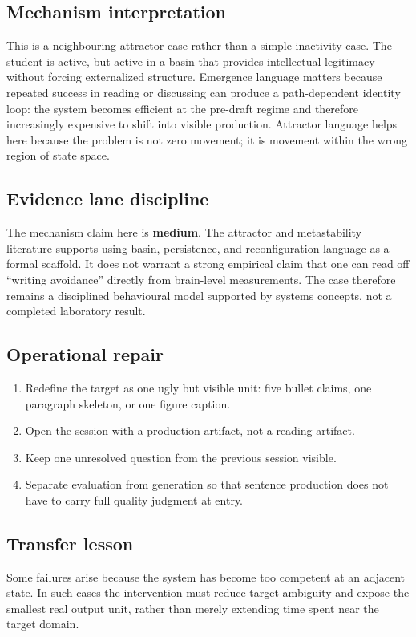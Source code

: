 \subsection*{Mechanism interpretation}
This is a neighbouring-attractor case rather than a simple inactivity case.
The student is active, but active in a basin that provides intellectual
legitimacy without forcing externalized structure. Emergence language matters
because repeated success in reading or discussing can produce a path-dependent
identity loop: the system becomes efficient at the pre-draft regime and
therefore increasingly expensive to shift into visible production. Attractor
language helps here because the problem is not zero movement; it is movement
within the wrong region of state space.

\subsection*{Evidence lane discipline}
The mechanism claim here is \textbf{medium}. The attractor and metastability
literature supports using basin, persistence, and reconfiguration language as a
formal scaffold. It does not warrant a strong empirical claim that one can read
off ``writing avoidance'' directly from brain-level measurements. The case
therefore remains a disciplined behavioural model supported by systems
concepts, not a completed laboratory result.

\subsection*{Operational repair}
\begin{enumerate}[nosep]
  \item Redefine the target as one ugly but visible unit: five bullet claims,
        one paragraph skeleton, or one figure caption.
  \item Open the session with a production artifact, not a reading artifact.
  \item Keep one unresolved question from the previous session visible.
  \item Separate evaluation from generation so that sentence production does
        not have to carry full quality judgment at entry.
\end{enumerate}

\subsection*{Transfer lesson}
Some failures arise because the system has become too competent at an adjacent
state. In such cases the intervention must reduce target ambiguity and expose
the smallest real output unit, rather than merely extending time spent near the
target domain.


